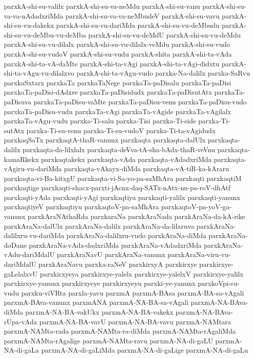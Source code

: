 {parxkA-shi-su-valilx
parxkA-shi-su-va-neMdu
parxkA-shi-su-vanu
parxkA-shi-su-va-va-nAdadxriMda
parxkA-shi-su-va-va-neMbudeV
parxkA-shi-su-vavu
parxkA-shi-su-vu-dakekx
parxkA-shi-su-vu-dariMda
parxkA-shi-su-vu-deMbudu
parxkA-shi-su-vu-deMbu-vu-deMba
parxkA-shi-su-vu-deMdU
parxkA-shi-su-vu-deMdu
parxkA-shi-su-vu-dilalx
parxkA-shi-su-vu-dilalx-veMdu
parxkA-shi-su-vudo
parxkA-shi-su-vudoV
parxkA-shi-su-vudu
parxkA-shita
parxkA-shi-ta-vAda
parxkA-shi-ta-vA-daMte
parxkA-shi-ta-vAgi
parxkA-shi-ta-vAgi-didxtu
parxkA-shi-ta-vAgu-vu-dilalxvo
parxkA-shi-ta-vAgu-vudo
parxka-Na-dalilx
parxka-SaRvu
parxkaSxtarx
parxkaTa
parxkaTaNege
parxkaTa-paDisalu
parxkaTa-paDisi
parxkaTa-paDisi-dAdxre
parxkaTa-paDisidudx
parxkaTa-paDisutAtx
parxkaTa-paDisuva
parxkaTa-paDisu-vaMte
parxkaTa-paDisu-venu
parxkaTa-paDisu-vudo
parxkaTa-paDisu-vudu
parxkaTa-vAgi
parxkaTa-vAgide
parxkaTa-vAgilalx
parxkaTa-vAgu-vudu
parxka-Ti-salu
parxka-Tisi
parxka-Ti-side
parxka-Ti-sutAtx
parxka-Ti-su-venu
parxka-Ti-su-vudoV
parxka-Ti-ta-vAgidudx
parxkaqSaTx
parxkaqtA-thaR-vanunx
parxkaqta
parxkaqta-dalUlx
parxkaqta-dalilx
parxkaqta-da-lilxlalx
parxkaqta-deVva-tA-sha-bAdx-thaR-veVnu
parxkaqta-kamaRkekx
parxkaqtakekx
parxkaqta-vAda
parxkaqta-vAdadxriMda
parxkaqta-vAgiru-vu-dariMda
parxkaqta-vAkayx-diMda
parxkaqta-vA-tiR-ka-kAraru
parxkaqta-vi-Ba-kitxgU
parxkaqta-vi-Sa-yo-pa-saMhAra
parxkaqti
parxkaqtiM
parxkaqtige
parxkaqti-shacx-parxti-jAcnx-daq-SATx-nAtx-nu-pa-roV-dhAtf
parxkaqti-yAda
parxkaqti-yAgi
parxkaqtiya
parxkaqti-yalilx
parxkaqti-yanunx
parxkaqtiyeV
parxkaqtiyu
parxkaqtoV-pa-saMhAra
parxkaqtoV-pa-yoV-ga-vanunx
parxkAraNAthaRda
parxkaraNa
parxkAraNada
parxkAraNa-da-kA-rike
parxkAraNa-dalUlx
parxkAraNa-dalilx
parxkAraNa-da-lilxruva
parxkAraNa-dalilxru-vu-dariMda
parxkAraNa-dalilxru-vudo
parxkAraNa-diMda
parxkAraNa-doDane
parxkAraNa-vAda-dadxriMda
parxkAraNa-vAdadxriMda
parxkAraNa-vAdu-dariMdalU
parxkAraNavU
parxkAraNa-vanunx
parxkAraNa-viru-vu-dariMdalU
parxkAraNavu
parxka-raNeV
parxkirxyA
parxkirxye
parxkirxye-gaLelalxvU
parxkirxyeya
parxkirxye-yalelx
parxkirxye-yalelxV
parxkirxye-yalilx
parxkirxye-yanunx
parxkirxyeye
parxkirxyeyu
parxki-ye-yanunx
parxkoVpi-su-vudu
parxku-viVRta
parxla-yavu
parxmA
parxmA-BAsa
parxmA-BA-sa-vAgali
parxmA-BAva-vanunx
parxmANA
parxmA-NA-BA-sa-vAgali
parxmA-NA-BAva-diMda
parxmA-NA-BA-vakUkx
parxmA-NA-BA-vakekx
parxmA-NA-BAva-rUpa-vAda
parxmA-NA-BA-vavU
parxmA-NA-BA-vavu
parxmA-NAMtara
parxmA-NAMta-rada
parxmA-NAMta-ra-diMda
parxmA-NAMta-rAgaliMda
parxmA-NAMta-rAgalige
parxmA-NAMta-ravu
parxmA-NA-di-gaLU
parxmA-NA-di-gaLa
parxmA-NA-di-gaLiMda
parxmA-NA-di-gaLige
parxmA-NA-di-gaLu
}
